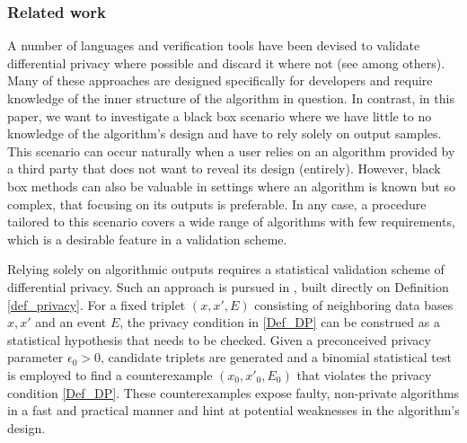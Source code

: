 \documentclass[conference]{IEEEtran}
\begin{document}
\subsubsection*{\textbf{Related work}}
A number of languages and verification tools have been devised to validate differential privacy where possible and discard it where not (see \cite{Reed2010, Gaobardi2013,Barthe2013,Barthe2014,Barthe2016,Barthe2016b,Hsu2017, Zhang2017,Kifer2019,Pierce2020,Barthe2020,CheckDP} among others). Many of these approaches are designed specifically for developers and require knowledge of the inner structure of the algorithm in question. In contrast, in this paper, we want to investigate a black box scenario where we have little to no knowledge of the algorithm's design and have to rely solely on output samples. This scenario can occur naturally when a user relies on an algorithm provided by a third party that does not want to reveal its design (entirely). However, black box methods can also be valuable in settings where an algorithm is known but so complex, that focusing on its outputs is preferable. In any case, a procedure tailored to this scenario covers a wide range of algorithms with few requirements, which is a desirable feature in a validation scheme.

Relying solely on algorithmic outputs requires a statistical validation scheme of differential privacy. Such an approach is pursued in \cite{StatDP}, built directly on Definition \ref{def_privacy}. For a fixed triplet $(x,x',E)$ consisting of neighboring data bases $x,x'$ and an event $E$, the privacy condition in \eqref{Def_DP} can be construed as a statistical hypothesis that needs to be checked. Given a preconceived privacy parameter $\epsilon_0 > 0$, candidate triplets
are generated and a binomial statistical test is employed to find a counterexample $(x_0,x'_0,E_0)$ that violates the privacy condition \eqref{Def_DP}.
These counterexamples expose faulty, non-private algorithms in a fast and practical manner and hint at potential weaknesses in the algorithm's design.
\end{document}
